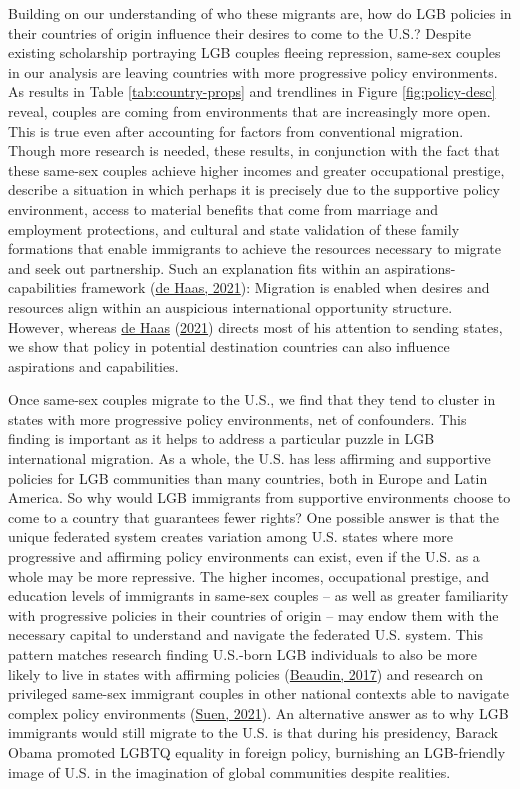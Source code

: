 \documentclass[
  11pt,
]{article}
\begin{document}
Building on our understanding of who these migrants are, how do LGB policies in their countries of origin influence their desires to come to the U.S.? Despite existing scholarship portraying LGB couples fleeing repression, same-sex couples in our analysis are leaving countries with more progressive policy environments. As results in Table \ref{tab:country-props} and trendlines in Figure \ref{fig:policy-desc} reveal, couples are coming from environments that are increasingly more open. This is true even after accounting for factors from conventional migration. Though more research is needed, these results, in conjunction with the fact that these same-sex couples achieve higher incomes and greater occupational prestige, describe a situation in which perhaps it is precisely due to the supportive policy environment, access to material benefits that come from marriage and employment protections, and cultural and state validation of these family formations that enable immigrants to achieve the resources necessary to migrate and seek out partnership. Such an explanation fits within an aspirations-capabilities framework (\protect\hyperlink{ref-dehaas_2021}{de Haas, 2021}): Migration is enabled when desires and resources align within an auspicious international opportunity structure. However, whereas \protect\hyperlink{ref-dehaas_2021}{de Haas} (\protect\hyperlink{ref-dehaas_2021}{2021}) directs most of his attention to sending states, we show that policy in potential destination countries can also influence aspirations and capabilities.

Once same-sex couples migrate to the U.S., we find that they tend to cluster in states with more progressive policy environments, net of confounders. This finding is important as it helps to address a particular puzzle in LGB international migration. As a whole, the U.S. has less affirming and supportive policies for LGB communities than many countries, both in Europe and Latin America. So why would LGB immigrants from supportive environments choose to come to a country that guarantees fewer rights? One possible answer is that the unique federated system creates variation among U.S. states where more progressive and affirming policy environments can exist, even if the U.S. as a whole may be more repressive. The higher incomes, occupational prestige, and education levels of immigrants in same-sex couples -- as well as greater familiarity with progressive policies in their countries of origin -- may endow them with the necessary capital to understand and navigate the federated U.S. system. This pattern matches research finding U.S.-born LGB individuals to also be more likely to live in states with affirming policies (\protect\hyperlink{ref-beaudin_2017}{Beaudin, 2017}) and research on privileged same-sex immigrant couples in other national contexts able to navigate complex policy environments (\protect\hyperlink{ref-suen_2021_sexual}{Suen, 2021}). An alternative answer as to why LGB immigrants would still migrate to the U.S. is that during his presidency, Barack Obama promoted LGBTQ equality in foreign policy, burnishing an LGB-friendly image of U.S. in the imagination of global communities despite realities.
\end{document}
